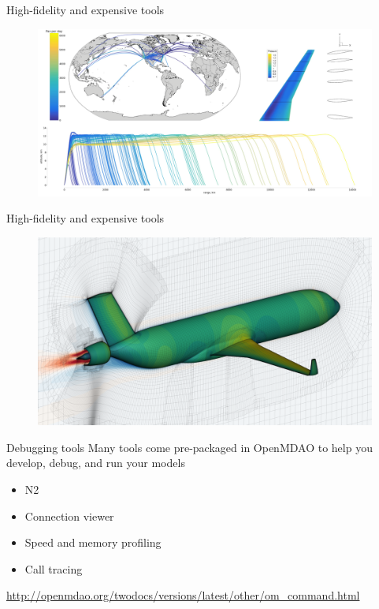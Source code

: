 \documentclass[aspectratio=169, usenames,dvipsnames, 14pt]{beamer}
\begin{document}
\begin{frame}{High-fidelity and expensive tools}
	\begin{figure}
		\includegraphics[scale=.45]{images/slide_124.png}
	\end{figure}
\end{frame}

\begin{frame}{High-fidelity and expensive tools}
	\begin{figure}
		\includegraphics[scale=0.38]{images/slide_125.png}
	\end{figure}
\end{frame}

\begin{frame}{Debugging tools}
	Many tools come pre-packaged in OpenMDAO to help you develop, debug, and run your models
	\begin{itemize}
		\item N2
		\item Connection viewer
		\item Speed and memory profiling
		\item Call tracing
	\end{itemize}
	\url{http://openmdao.org/twodocs/versions/latest/other/om_command.html}
\end{frame}
\end{document}
